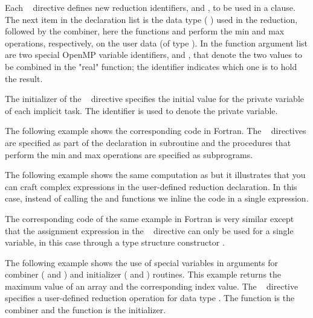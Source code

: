 Each ~ directive defines new reduction identifiers,
 and , to be used in a  clause. The next item in the
declaration list is the data type ( ) used in the reduction,
followed by the combiner, here the functions  and  perform
the min and max operations, respectively, on the user data (of type  ).
In the function argument list are two special OpenMP variable identifiers,  and ,
that denote the two values to be combined in the "real" function;
the  identifier indicates which one is to hold the result.

The initializer of the ~ directive specifies
the initial value for the private variable of each implicit task.
The  identifier is used to denote the private variable.


The following example shows the corresponding code in Fortran. 
The ~ directives are specified as part of 
the declaration in subroutine  and 
the procedures that perform the min and max operations are specified as subprograms.



The following example shows the same computation as  but it illustrates that you can craft complex expressions in the user-defined reduction declaration. In this case, instead of calling the  and  functions we inline the code in a single expression.


The corresponding code of the same example in Fortran is very similar
except that the assignment expression in the ~
directive can only be used for a single variable, in this case through
a type structure constructor .



The following example shows the use of special variables in arguments for combiner ( and ) and initializer ( and ) routines.  This example returns the maximum value of an array and the corresponding index value. The ~ directive specifies a user-defined reduction operation  for data type  . The function  is the combiner and the function  is the initializer.

